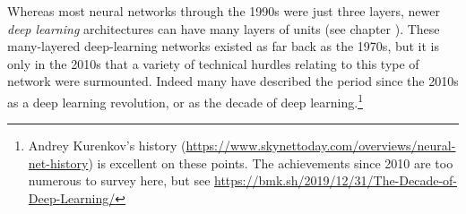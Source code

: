 Whereas most neural networks through the 1990s were just three layers, newer \emph{deep learning} architectures can have many layers of units (see chapter ). These many-layered deep-learning networks existed as far back as the 1970s, but it is only in the 2010s  that a variety of technical hurdles relating to this type of network were surmounted. Indeed many have described the period since the 2010s as a deep learning revolution, or as the decade of deep learning.\footnote{Andrey Kurenkov's history (\url{https://www.skynettoday.com/overviews/neural-net-history}) is excellent on these points. The achievements since 2010 are too numerous to survey here, but see \url{https://bmk.sh/2019/12/31/The-Decade-of-Deep-Learning/}} 